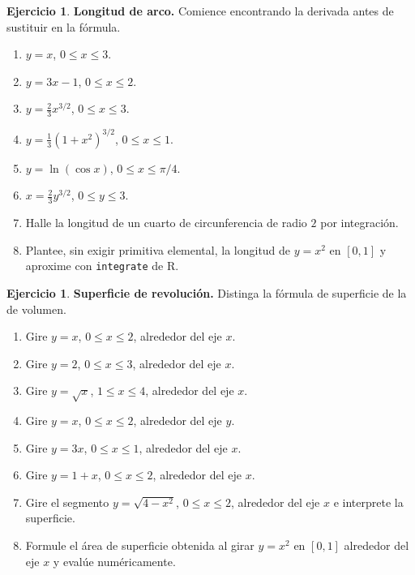 \documentclass[12pt]{article}
\theoremstyle{definition}
\newtheorem{Ejer}[teorema]{Ejercicio}
\theoremstyle{remark}
\begin{document}
\begin{Ejer}\textbf{Longitud de arco.} Comience encontrando la derivada antes de sustituir en la fórmula.
\begin{enumerate}[resume=banco3]
\item $y=x$, $0\le x\le3$.
\item $y=3x-1$, $0\le x\le2$.
\item $y=\frac23x^{3/2}$, $0\le x\le3$.
\item $y=\frac13(1+x^2)^{3/2}$, $0\le x\le1$.
\item $y=\ln(\cos x)$, $0\le x\le\pi/4$.
\item $x=\frac23y^{3/2}$, $0\le y\le3$.
\item Halle la longitud de un cuarto de circunferencia de radio $2$ por integración.
\item Plantee, sin exigir primitiva elemental, la longitud de $y=x^2$ en $[0,1]$ y aproxime con \texttt{integrate} de R.
\end{enumerate}
\end{Ejer}

\begin{Ejer}\textbf{Superficie de revolución.} Distinga la fórmula de superficie de la de volumen.
\begin{enumerate}[resume=banco3]
\item Gire $y=x$, $0\le x\le2$, alrededor del eje $x$.
\item Gire $y=2$, $0\le x\le3$, alrededor del eje $x$.
\item Gire $y=\sqrt x$, $1\le x\le4$, alrededor del eje $x$.
\item Gire $y=x$, $0\le x\le2$, alrededor del eje $y$.
\item Gire $y=3x$, $0\le x\le1$, alrededor del eje $x$.
\item Gire $y=1+x$, $0\le x\le2$, alrededor del eje $x$.
\item Gire el segmento $y=\sqrt{4-x^2}$, $0\le x\le2$, alrededor del eje $x$ e interprete la superficie.
\item Formule el área de superficie obtenida al girar $y=x^2$ en $[0,1]$ alrededor del eje $x$ y evalúe numéricamente.
\end{enumerate}
\end{Ejer}
\end{document}
